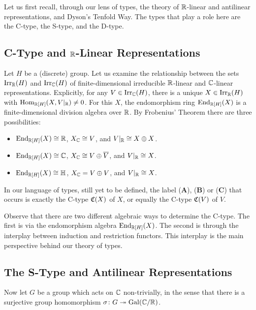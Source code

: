 Let us first recall, through our lens of types, the theory of ${\mathbb R}$-linear and antilinear representations, and Dyson's Tenfold Way. The types that play a role here are the C-type, the S-type, and the D-type.

\subsection*{C-Type and ${\mathbb R}$-Linear Representations}

Let $H$ be a (discrete) group.
Let us examine the relationship between the sets
$\operatorname{Irr}_{{\mathbb R}}(H)$ and $\operatorname{Irr}_{{\mathbb C}}(H)$
of finite-dimensional irreducible ${\mathbb R}$-linear and ${\mathbb C}$-linear representations.
Explicitly, for any $V \in \operatorname{Irr}_{{\mathbb C}}(H)$, there is a unique $X \in \operatorname{Irr}_{{\mathbb R}}(H)$ with $\operatorname{Hom}_{{\mathbb R}[H]}(X, V|_{{\mathbb R}}) \neq 0$.
For this $X$, the endomorphism ring $\operatorname{End}_{{\mathbb R}[H]}(X)$ is a finite-dimensional division algebra over ${\mathbb R}$.
By Frobenius' Theorem there are three possibilities:

\begin{itemize}
    \item[(\textbf{A})] $\operatorname{End}_{{\mathbb R}[H]}(X) \cong {\mathbb R}$, $X_{{\mathbb C}} \cong V$, and $V|_{{\mathbb R}} \cong X \oplus X$.
    \item[(\textbf{B})] $\operatorname{End}_{{\mathbb R}[H]}(X) \cong {\mathbb C}$, $X_{{\mathbb C}} \cong V \oplus \overline{V}$, and $V|_{{\mathbb R}} \cong X$.
    \item[(\textbf{C})] $\operatorname{End}_{{\mathbb R}[H]}(X) \cong {\mathbb H}$, $X_{{\mathbb C}} = V \oplus V$, and $V|_{{\mathbb R}} \cong X$.
\end{itemize}

In our language of types, still yet to be defined, the label (\textbf{A}), (\textbf{B}) or (\textbf{C}) that occurs is exactly the C-type ${\mathfrak C}(X)$ of $X$, or equally the C-type ${\mathfrak C}(V)$ of $V$. 

Observe that there are two different algebraic ways to determine the C-type. The first is via the endomorphism algebra $\operatorname{End}_{{\mathbb R}[H]}(X)$. The second is through the interplay between induction and restriction functors. This interplay is the main perspective behind our theory of types.

\subsection*{The S-Type and Antilinear Representations}
Now let $G$ be a group which acts on ${\mathbb C}$ non-trivially, in the sense that there is a surjective group homomorphism $\sigma \colon G \twoheadrightarrow \operatorname{Gal}({\mathbb C} / {\mathbb R})$.

